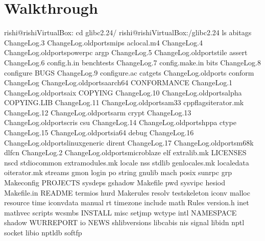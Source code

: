 \documentclass[letterpaper,10pt,english]{sphinxmanual}
\begin{document}
\section{Walkthrough }
\label{\detokenize{03_glibc:walkthrough-glibc}}
\begin{sphinxVerbatim}[commandchars=\\\{\}]
rishi@rishi\PYGZhy{}VirtualBox:\PYGZti{}\PYGZdl{} cd glibc\PYGZhy{}2.24/
rishi@rishi\PYGZhy{}VirtualBox:\PYGZti{}/glibc\PYGZhy{}2.24\PYGZdl{} ls
abi\PYGZhy{}tags          ChangeLog.3                        ChangeLog.old\PYGZhy{}ports\PYGZhy{}mips
aclocal.m4        ChangeLog.4                        ChangeLog.old\PYGZhy{}ports\PYGZhy{}powerpc
argp              ChangeLog.5                        ChangeLog.old\PYGZhy{}ports\PYGZhy{}tile
assert            ChangeLog.6                        config.h.in
benchtests        ChangeLog.7                        config.make.in
bits              ChangeLog.8                        configure
BUGS              ChangeLog.9                        configure.ac
catgets           ChangeLog.old\PYGZhy{}ports                conform
ChangeLog         ChangeLog.old\PYGZhy{}ports\PYGZhy{}aarch64        CONFORMANCE
ChangeLog.1       ChangeLog.old\PYGZhy{}ports\PYGZhy{}aix            COPYING
ChangeLog.10      ChangeLog.old\PYGZhy{}ports\PYGZhy{}alpha          COPYING.LIB
ChangeLog.11      ChangeLog.old\PYGZhy{}ports\PYGZhy{}am33           cppflags\PYGZhy{}iterator.mk
ChangeLog.12      ChangeLog.old\PYGZhy{}ports\PYGZhy{}arm            crypt
ChangeLog.13      ChangeLog.old\PYGZhy{}ports\PYGZhy{}cris           csu
ChangeLog.14      ChangeLog.old\PYGZhy{}ports\PYGZhy{}hppa           ctype
ChangeLog.15      ChangeLog.old\PYGZhy{}ports\PYGZhy{}ia64           debug
ChangeLog.16      ChangeLog.old\PYGZhy{}ports\PYGZhy{}linux\PYGZhy{}generic  dirent
ChangeLog.17      ChangeLog.old\PYGZhy{}ports\PYGZhy{}m68k           dlfcn
ChangeLog.2       ChangeLog.old\PYGZhy{}ports\PYGZhy{}microblaze     elf
extra\PYGZhy{}lib.mk      LICENSES     nscd                  stdio\PYGZhy{}common
extra\PYGZhy{}modules.mk  locale       nss                   stdlib
gen\PYGZhy{}locales.mk    localedata   o\PYGZhy{}iterator.mk         streams
gmon              login        po                    string
gnulib            mach         posix                 sunrpc
grp               Makeconfig   PROJECTS              sysdeps
gshadow           Makefile     pwd                   sysvipc
hesiod            Makefile.in  README                termios
hurd              Makerules    resolv          test\PYGZhy{}skeleton
iconv             malloc       resource        time
iconvdata         manual       rt              timezone
include           math         Rules           version.h
inet              mathvec      scripts         wcsmbs
INSTALL           misc         setjmp          wctype
intl              NAMESPACE    shadow          WUR\PYGZhy{}REPORT
io                NEWS         shlib\PYGZhy{}versions
libc\PYGZhy{}abis         nis          signal
libidn            nptl         socket
libio             nptl\PYGZus{}db      soft\PYGZhy{}fp
\end{sphinxVerbatim}
\end{document}
